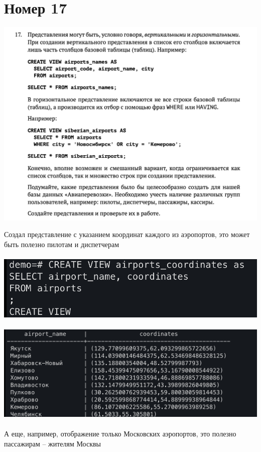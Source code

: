 \documentclass[a4paper,12pt]{article}
\begin{document}
\section*{Номер 17}
\begin{center}
\includegraphics[scale=0.7]{17.png}
\end{center}
\clearpage
Создал представление с указанием координат каждого из аэропортов, это может быть полезно пилотам и диспетчерам
\\\\
\includegraphics[scale=0.5]{171.png}
\\\\
\includegraphics[scale=0.5]{172.png}
\\\\
А еще, например, отображение только Московских аэропортов, это полезно пассажирам -- жителям Москвы
\end{document}
